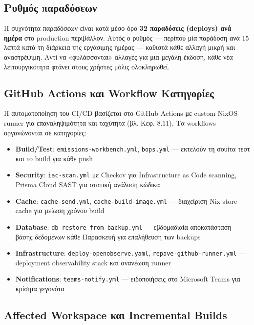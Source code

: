 \subsection{Ρυθμός
παραδόσεων}\label{ux3c1ux3c5ux3b8ux3bcux3ccux3c2-ux3c0ux3b1ux3c1ux3b1ux3b4ux3ccux3c3ux3b5ux3c9ux3bd}

Η συχνότητα παραδόσεων είναι κατά μέσο όρο \textbf{32 παραδόσεις
(deploys) ανά ημέρα} στο production περιβάλλον. Αυτός ο ρυθμός ---
περίπου μία παράδοση ανά 15 λεπτά κατά τη διάρκεια της εργάσιμης ημέρας
--- καθιστά κάθε αλλαγή μικρή και αναστρέψιμη. Αντί να «φυλάσσονται»
αλλαγές για μια μεγάλη έκδοση, κάθε νέα λειτουργικότητα φτάνει στους
χρήστες μόλις ολοκληρωθεί.

\subsection{GitHub Actions και Workflow
Κατηγορίες}\label{github-actions-ux3baux3b1ux3b9-workflow-ux3baux3b1ux3c4ux3b7ux3b3ux3bfux3c1ux3afux3b5ux3c2}

Η αυτοματοποίηση του CI/CD βασίζεται στο GitHub Actions με custom NixOS
runner για επαναληψιμότητα και ταχύτητα (βλ. Κεφ. 8.11). Τα workflows
οργανώνονται σε κατηγορίες:

\begin{itemize}
\tightlist
\item
  \textbf{Build/Test}: \texttt{emissions-workbench.yml},
  \texttt{bops.yml} --- εκτελούν τη σουίτα τεστ και το build για κάθε
  push
\item
  \textbf{Security}: \texttt{iac-scan.yml} με Checkov για Infrastructure
  as Code scanning, Prisma Cloud SAST για στατική ανάλυση κώδικα
\item
  \textbf{Cache}: \texttt{cache-send.yml},
  \texttt{cache-build-image.yml} --- διαχείριση Nix store cache για
  μείωση χρόνου build
\item
  \textbf{Database}: \texttt{db-restore-from-backup.yml} --- εβδομαδιαία
  αποκατάσταση βάσης δεδομένων κάθε Παρασκευή για επαλήθευση των backups
\item
  \textbf{Infrastructure}: \texttt{deploy-openobserve.yaml},
  \texttt{repave-github-runner.yml} --- deployment observability stack
  και ανανέωση runner
\item
  \textbf{Notifications}: \texttt{teams-notify.yml} --- ειδοποιήσεις στο
  Microsoft Teams για κρίσιμα γεγονότα
\end{itemize}

\subsection{Affected Workspace και Incremental
Builds}\label{affected-workspace-ux3baux3b1ux3b9-incremental-builds}

